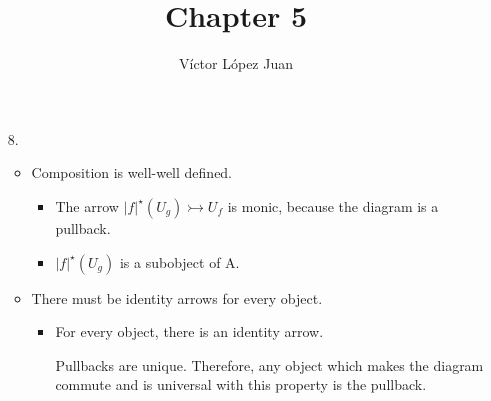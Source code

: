 \documentclass{article}
\author{Víctor López Juan}
\title{Chapter 5}
\begin{document}
\begin{enumerate}

  \item[8.]

    \begin{itemize}
      \item Composition is well-well defined.
        

      \begin{itemize}
        \item The arrow $\vert f \vert^\star (U_g) \rightarrowtail U_f$
          is monic, because the diagram is a pullback.

        \item $\vert f \vert ^\star (U_g)$ is a subobject of A.

      \end{itemize}


      \item There must be identity arrows for every object.

        \begin{itemize}
          \item For every object, there is an identity arrow.

    

            \begin{tikzpicture}
              
            \end{tikzpicture}
            
            Pullbacks are unique. Therefore, any object which makes
            the diagram commute and is universal with this property
            is the pullback.
            
\end{itemize}
\end{itemize}
\end{enumerate}
\end{document}
